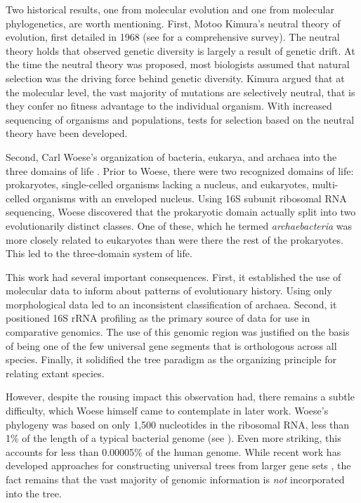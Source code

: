Two historical results, one from molecular evolution and one from molecular phylogenetics, are worth mentioning.
First, Motoo Kimura's neutral theory of evolution, first detailed in 1968 \cite{Kimura:1968vw} (see \cite{Kimura:1984} for a comprehensive survey).
The neutral theory holds that observed genetic diversity is largely a result of genetic drift.
At the time the neutral theory was proposed, most biologists assumed that natural selection was the driving force behind genetic diversity.
Kimura argued that at the molecular level, the vast majority of mutations are selectively neutral, that is they confer no fitness advantage to the individual organism.
With increased sequencing of organisms and populations, tests for selection based on the neutral theory have been developed.

Second, Carl Woese's organization of bacteria, eukarya, and archaea into the three domains of life \cite{Woese:1977vd}.
Prior to Woese, there were two recognized domains of life: prokaryotes, single-celled organisms lacking a nucleus, and eukaryotes, multi-celled organisms with an enveloped nucleus.
Using 16S subunit ribosomal RNA sequencing, Woese discovered that the prokaryotic domain actually split into two evolutionarily distinct classes.
One of these, which he termed \emph{archaebacteria} was more closely related to eukaryotes than were there the rest of the prokaryotes.
This led to the three-domain system of life.

This work had several important consequences.
First, it established the use of molecular data to inform about patterns of evolutionary history.
Using only morphological data led to an inconsistent classification of archaea.
Second, it positioned 16S rRNA profiling as the primary source of data for use in comparative genomics.
The use of this genomic region was justified on the basis of being one of the few universal gene segments  that is orthologous across all species.
Finally, it solidified the tree paradigm as the organizing principle for relating extant species.

However, despite the rousing impact this observation had, there remains a subtle difficulty, which Woese himself came to contemplate in later work.
Woese's phylogeny was based on only 1,500 nucleotides in the ribosomal RNA, less than 1\% of the length of a typical bacterial genome (see \cite{Dagan:2006up}).
Even more striking, this accounts for less than 0.00005\% of the human genome.
While recent work has developed approaches for constructing universal trees from larger gene sets \cite{Ciccarelli:2006gw}, the fact remains that the vast majority of genomic information is \emph{not} incorporated into the tree.


